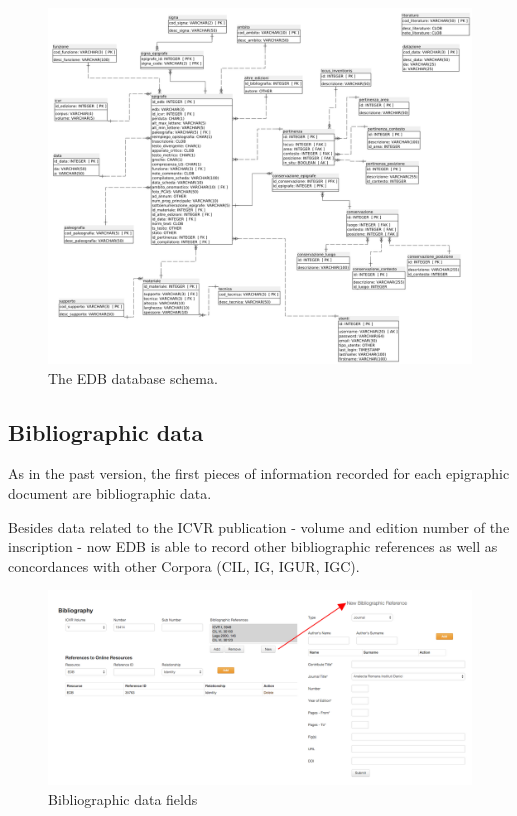 \documentclass[amsthm,ebook]{saparticle}
\begin{document}
\begin{figure}[hbp]
\centering
 \includegraphics[width=\columnwidth]{EAGLE2016Roccoengrev-img004.png} 
\caption{The EDB database schema.}
\label{fig:4}
\end{figure}




\subsection{Bibliographic data}


As in the past version, the first pieces of information recorded for each epigraphic document are bibliographic data.

Besides data related to the ICVR publication - volume and edition number of the inscription - now EDB is able to record
other bibliographic references as well as concordances with other Corpora (CIL, IG, IGUR, IGC). 

\begin{figure}[!hbp]
\centering
 \includegraphics[width=\columnwidth]{Fig4.png}
\caption{Bibliographic data fields}
\label{fig:3b}
\end{figure}
\end{document}
